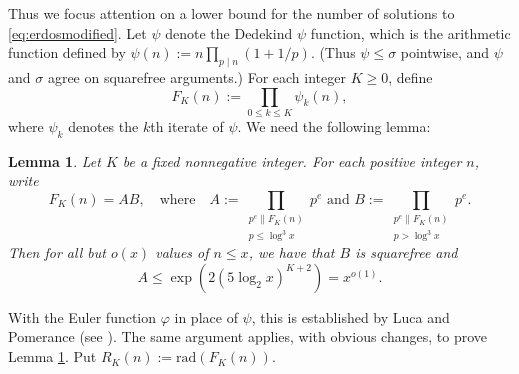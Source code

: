 \documentclass[12pt]{amsart}
\newtheorem{lem}{Lemma}
\theoremstyle{definition}
\theoremstyle{remark}
\renewcommand\phi\varphi
\newcommand{\rad}{\mathrm{rad}}
\begin{document}
Thus we focus attention on a lower bound for the number of solutions to \eqref{eq:erdosmodified}. Let $\psi$ denote the Dedekind $\psi$ function, which is the arithmetic function defined by $\psi(n):= n \prod_{p \mid n}(1+1/p)$. (Thus $\psi \leq  \sigma$ pointwise, and $\psi$ and $\sigma$ agree on squarefree arguments.) For each integer $K\geq 0$, define
\[  F_K(n):= \prod_{0 \leq k \leq K} \psi_k(n),\]
where $\psi_k$ denotes the $k$th iterate of $\psi$. We need the following lemma:

\begin{lem}\label{lem:LP} Let $K$ be a fixed nonnegative integer. For each positive integer $n$, write
\[ F_K(n) = AB, \quad \text{where}\quad A := \prod_{\substack{p^e \parallel F_K(n) \\ p \leq \log^3{x}}} p^e\text{ and } B:= \prod_{\substack{p^e \parallel F_K(n) \\ p > \log^3{x}}} p^e. \] Then for all but $o(x)$ values of $n \leq x$, we have that $B$ is squarefree and
\[ A \leq \exp(2(5\log_2{x})^{K+2}) = x^{o(1)}. \]
\end{lem}

With the Euler function $\phi$ in place of $\psi$, this is established by Luca and Pomerance (see \cite[\S3.2]{LP07}). The same argument applies, with obvious changes, to prove Lemma \ref{lem:LP}. Put $R_K(n):= \rad(F_K(n))$.
\end{document}
